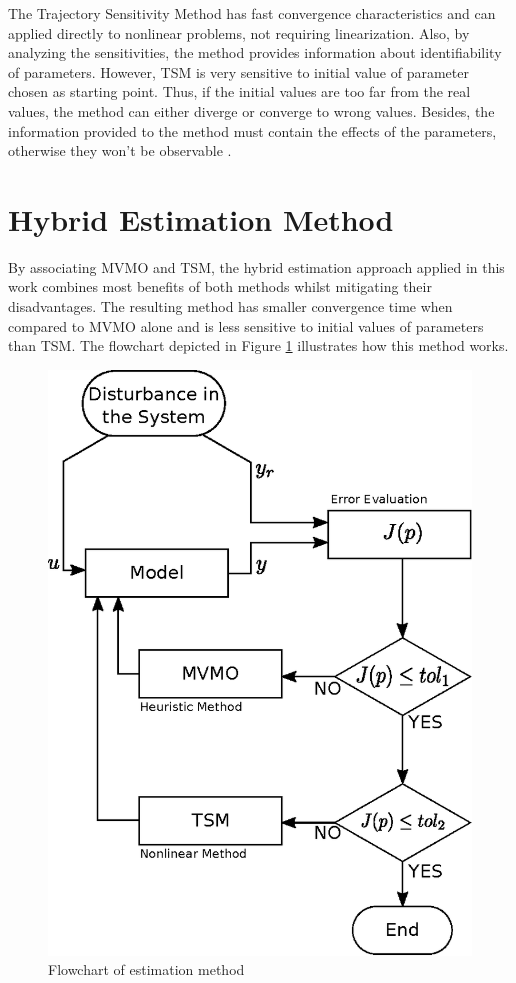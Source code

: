 The Trajectory Sensitivity Method has fast convergence characteristics and can applied directly to nonlinear problems, not requiring linearization. Also, by analyzing the sensitivities, the method provides information about identifiability of parameters. However, TSM is very sensitive to initial value of parameter chosen as starting point. Thus, if the initial values are too far from the real values, the method can either diverge or converge to wrong values. Besides, the information provided to the method must contain the effects of the parameters, otherwise they won't be observable \cite{Benchluch1993}.

\section{Hybrid Estimation Method}
\label{sec: Hybrid_Method}

By associating MVMO and TSM, the hybrid estimation approach applied in this work combines most benefits of both methods whilst mitigating their disadvantages. The resulting method has smaller convergence time when compared to MVMO alone and is less sensitive to initial values of parameters than TSM. The flowchart depicted in Figure \ref{fig: flowchart} illustrates how this method works.

\begin{figure}[h]
	\caption{Flowchart of estimation method}
	\begin{center}
		\includegraphics[scale=0.7]{Images/Flowchart.eps}
	\end{center}
	\label{fig: flowchart}
\end{figure}

